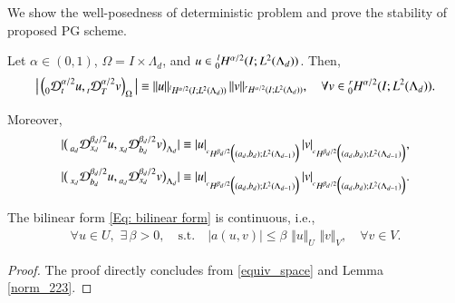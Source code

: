 We show the well-posedness of deterministic problem and prove the stability of proposed PG scheme. %
%
\begin{lem}
	\label{norm_223}
	Let $\alpha \in (0,1)$, $\Omega=I \times \Lambda_d$, and $u\in \prescript{l}{0}H^{\alpha/2}(I; L^2(\Lambda_d))$. Then, 
	\begin{equation*}
	\big\vert \left( \prescript{}{0}{\mathcal{D}}_{t}^{\alpha/2} u, \prescript{}{t}{\mathcal{D}}_{T}^{\alpha/2} v \right)_{\Omega} \big\vert \equiv \Vert u \Vert_{\prescript{l}{}H^{\alpha/2}(I; L^2(\Lambda_d))} \, \Vert v \Vert_{\prescript{r}{}H^{\alpha/2}(I; L^2(\Lambda_d))},
	\quad 
	\forall v \in \prescript{r}{0}H^{\alpha/2}(I; L^2(\Lambda_d)).
	\end{equation*}
\end{lem}
%
Moreover,
%
\begin{align}
%
\label{equiv_space}
\vert \big(\prescript{}{a_d}{\mathcal{D}}_{x_d}^{\beta_d/2} u, \prescript{}{x_d}{\mathcal{D}}_{b_d}^{\beta_d/2} v\big)_{\Lambda_d} \vert \equiv  \vert u \vert_{\prescript{c}{}H^{\beta_d/2} \Big((a_d,b_d); L^2(\Lambda_{d-1}) \Big)} \, \vert v \vert_{\prescript{c}{}H^{\beta_d/2} \Big((a_d,b_d); L^2(\Lambda_{d-1}) \Big)},
%
\\
\label{equiv_space2}
\vert \big(\prescript{}{x_d}{\mathcal{D}}_{b_d}^{\beta_d/2} u, \prescript{}{a_d}{\mathcal{D}}_{x_d}^{\beta_d/2} v\big)_{\Lambda_d} \vert \equiv  \vert u \vert_{\prescript{c}{}H^{\beta_d/2} \Big((a_d,b_d); L^2(\Lambda_{d-1}) \Big)} \, \vert v \vert_{\prescript{c}{}H^{\beta_d/2} \Big((a_d,b_d); L^2(\Lambda_{d-1}) \Big)}.
%
\end{align} 
%



% 
\begin{lem}[Continuity]
	\label{continuity_lem}
	The bilinear form \eqref{Eq: bilinear form} is continuous, i.e.,
	\begin{align}
	\label{continuity_eq}
	\forall u \in U, \,\,
	\exists \, \beta > 0,  
	\quad \text{s.t.} \quad 
	\vert a(u,v)\vert \leq 
	\beta \,\,   \Vert u \Vert_{U}   \,\,     \Vert v \Vert_{V},
	\quad \forall v \in V.
	\end{align}
\end{lem}
%
%
\begin{proof}
	The proof directly concludes from \eqref{equiv_space} and Lemma \ref{norm_223}.
\end{proof}	
%


